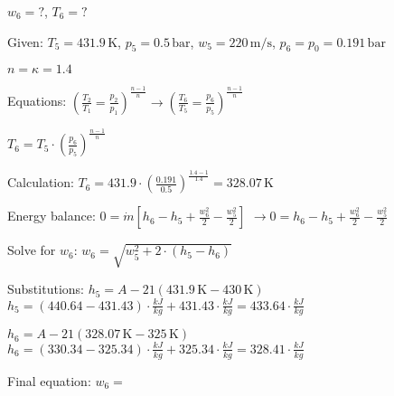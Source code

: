 \( w_6 = ? \), \( T_6 = ? \)  

Given:  
\( T_5 = 431.9 \, \text{K} \), \( p_5 = 0.5 \, \text{bar} \), \( w_5 = 220 \, \text{m/s} \), \( p_6 = p_0 = 0.191 \, \text{bar} \)  

\( n = \kappa = 1.4 \)  

Equations:  
\( \left( \frac{T_2}{T_1} = \frac{p_2}{p_1} \right)^{\frac{n-1}{n}} \rightarrow \left( \frac{T_6}{T_5} = \frac{p_6}{p_5} \right)^{\frac{n-1}{n}} \)  

\( T_6 = T_5 \cdot \left( \frac{p_6}{p_5} \right)^{\frac{n-1}{n}} \)  

Calculation:  
\( T_6 = 431.9 \cdot \left( \frac{0.191}{0.5} \right)^{\frac{1.4-1}{1.4}} = 328.07 \, \text{K} \)  

Energy balance:  
\( 0 = \dot{m} \left[ h_6 - h_5 + \frac{w_6^2}{2} - \frac{w_5^2}{2} \right] \)  
\( \rightarrow 0 = h_6 - h_5 + \frac{w_6^2}{2} - \frac{w_5^2}{2} \)  

Solve for \( w_6 \):  
\( w_6 = \sqrt{w_5^2 + 2 \cdot (h_5 - h_6)} \)  

Substitutions:  
\( h_5 = A-21 (431.9 \, \text{K} - 430 \, \text{K}) \)  
\( h_5 = (440.64 - 431.43) \cdot \frac{kJ}{kg} + 431.43 \cdot \frac{kJ}{kg} = 433.64 \cdot \frac{kJ}{kg} \)  

\( h_6 = A-21 (328.07 \, \text{K} - 325 \, \text{K}) \)  
\( h_6 = (330.34 - 325.34) \cdot \frac{kJ}{kg} + 325.34 \cdot \frac{kJ}{kg} = 328.41 \cdot \frac{kJ}{kg} \)  

Final equation:  
\( w_6 = \)